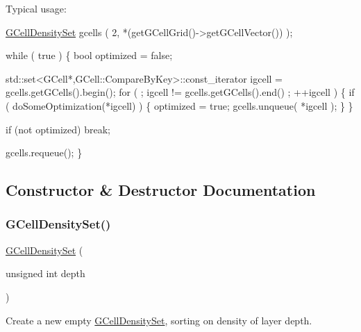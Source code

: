 Typical usage\+: 
\begin{DoxyCode}
\mbox{\hyperlink{classKatabatic_1_1GCellDensitySet_ad74cbb404ad28f734f5759462aa9f363}{GCellDensitySet}} gcells ( 2, *(getGCellGrid()->getGCellVector()) );

\textcolor{keywordflow}{while} ( \textcolor{keyword}{true} ) \{
    \textcolor{keywordtype}{bool} optimized = \textcolor{keyword}{false};

    std::set<GCell*,GCell::CompareByKey>::const\_iterator igcell = gcells.getGCells().begin();
    \textcolor{keywordflow}{for} ( ; igcell != gcells.getGCells().end() ; ++igcell ) \{
        \textcolor{keywordflow}{if} ( doSomeOptimization(*igcell) ) \{
          optimized = \textcolor{keyword}{true};
          gcells.unqueue( *igcell );
        \}
    \}

    \textcolor{keywordflow}{if} (not optimized) \textcolor{keywordflow}{break};

    gcells.requeue();
\}
\end{DoxyCode}
 

\subsection{Constructor \& Destructor Documentation}
\mbox{\label{classKatabatic_1_1GCellDensitySet_ad74cbb404ad28f734f5759462aa9f363}} 
\subsubsection{\texorpdfstring{G\+Cell\+Density\+Set()}{GCellDensitySet()}\hspace{0.1cm}{\footnotesize\ttfamily [1/2]}}
{\footnotesize\ttfamily \mbox{\hyperlink{classKatabatic_1_1GCellDensitySet}{G\+Cell\+Density\+Set}} (\begin{DoxyParamCaption}\item[{unsigned int}]{depth }\end{DoxyParamCaption})}

Create a new empty \mbox{\hyperlink{classKatabatic_1_1GCellDensitySet}{G\+Cell\+Density\+Set}}, sorting on density of layer {\ttfamily depth}. \mbox{\label{classKatabatic_1_1GCellDensitySet_a5d97169315528fca978d5e65a3cc8130}} 
